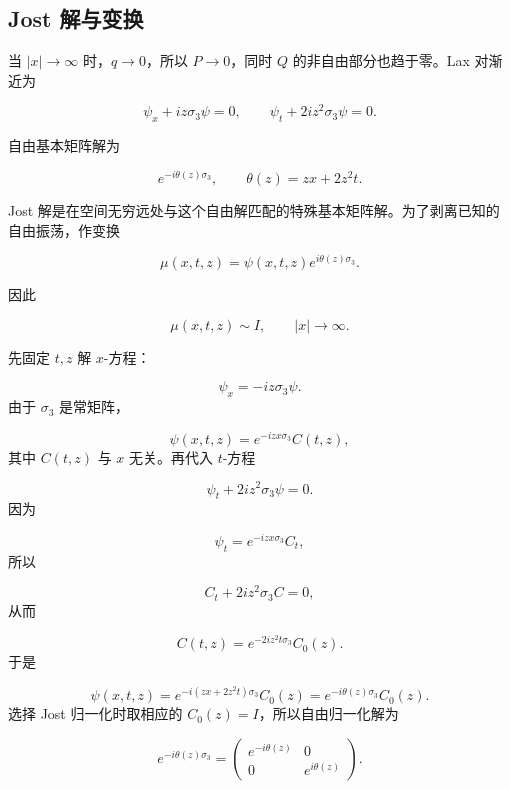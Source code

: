 \documentclass[
    lang=cn,
    scheme=chinese,
    mode=simple,
    device=normal,
    color=blue,
    math=cm,
    thmcnt=section,
    12pt,
    nowatermark
]{elegantbook}
\begin{document}
\subsection{Jost 解与变换}

当 $\lvert x\rvert\to\infty$ 时，$q\to0$，所以 $P\to0$，同时 $Q$ 的非自由部分也趋于零。Lax 对渐近为

\[
    \psi_x+iz\sigma_3\psi=0,\qquad
    \psi_t+2iz^2\sigma_3\psi=0.
\]

自由基本矩阵解为

\[
    e^{-i\theta(z)\sigma_3},
    \qquad
    \theta(z)=zx+2z^2t.
\]

Jost 解是在空间无穷远处与这个自由解匹配的特殊基本矩阵解。为了剥离已知的自由振荡，作变换

\begin{equation}
    \mu(x,t,z)=\psi(x,t,z)e^{i\theta(z)\sigma_3}.
    \tag{5.1.5}
    \label{eq:5.1.5}
\end{equation}

因此

\begin{equation}
    \mu(x,t,z)\sim I,\qquad \lvert x\rvert\to\infty.
    \tag{5.1.6}
    \label{eq:5.1.6}
\end{equation}

\begin{callout}[计算：这个自由基本解是怎样求出来的？]
    先固定 $t,z$ 解 $x$-方程：

    \[
        \psi_x=-iz\sigma_3\psi.
    \]
    由于 $\sigma_3$ 是常矩阵，

    \[
        \psi(x,t,z)
        =
        e^{-izx\sigma_3}C(t,z),
    \]
    其中 $C(t,z)$ 与 $x$ 无关。再代入 $t$-方程

    \[
        \psi_t+2iz^2\sigma_3\psi=0.
    \]
    因为

    \[
        \psi_t=e^{-izx\sigma_3}C_t,
    \]
    所以

    \[
        C_t+2iz^2\sigma_3C=0,
    \]
    从而

    \[
        C(t,z)
        =
        e^{-2iz^2t\sigma_3}C_0(z).
    \]
    于是

    \[
        \psi(x,t,z)
        =
        e^{-i(zx+2z^2t)\sigma_3}C_0(z)
        =
        e^{-i\theta(z)\sigma_3}C_0(z).
    \]
    选择 Jost 归一化时取相应的 $C_0(z)=I$，所以自由归一化解为

    \[
        e^{-i\theta(z)\sigma_3}
        =
        \begin{pmatrix}
            e^{-i\theta(z)} & 0              \\
            0               & e^{i\theta(z)}
        \end{pmatrix}.
    \]

\end{callout}
\end{document}
